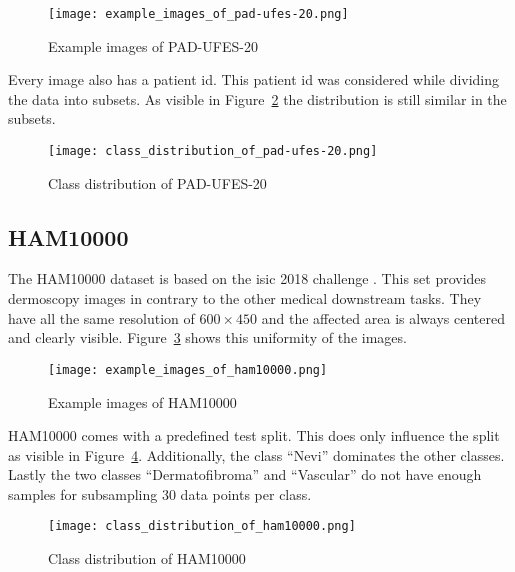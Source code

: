 \begin{figure}[H]
    \begin{center}
    \texttt{[image: example\_images\_of\_pad-ufes-20.png]}
    \caption{Example images of PAD-UFES-20}\label{fig:example_images_of_pad-ufes-20}
    \end{center}
\end{figure}

Every image also has a patient id. This patient id was considered while dividing the data into subsets. 
As visible in Figure~\ref{fig:class_distribution_of_pad-ufes-20} the distribution is still similar in the subsets. 

\begin{figure}[H]
    \begin{center}
    \texttt{[image: class\_distribution\_of\_pad-ufes-20.png]}
    \caption{Class distribution of PAD-UFES-20}\label{fig:class_distribution_of_pad-ufes-20}
    \end{center}
\end{figure}


\subsection{HAM10000}
The HAM10000 dataset is based on the \gls{isic} 2018 challenge \autocite{codella2019}. 
This set provides dermoscopy images in contrary to the other medical downstream tasks.
They have all the same resolution of $600 \times 450$ and the affected area is always centered and clearly visible.
Figure~\ref{fig:example_images_of_ham10000} shows this uniformity of the images. 
\begin{figure}[H]
    \begin{center}
    \texttt{[image: example\_images\_of\_ham10000.png]}
    \caption{Example images of HAM10000}\label{fig:example_images_of_ham10000}
    \end{center}
\end{figure}
HAM10000 comes with a predefined test split. This does only influence the split as visible in Figure~\ref{fig:class_distribution_of_ham10000}.
Additionally, the class ``Nevi'' dominates the other classes. 
Lastly the two classes ``Dermatofibroma'' and ``Vascular'' do not have enough samples for subsampling 30 data points per class.
\begin{figure}[H]
    \begin{center}
    \texttt{[image: class\_distribution\_of\_ham10000.png]}
    \caption{Class distribution of HAM10000}\label{fig:class_distribution_of_ham10000}
    \end{center}
\end{figure}

